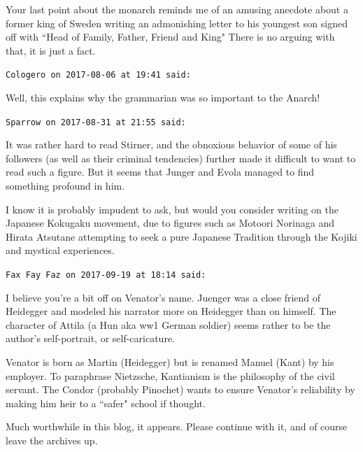 \begin{footnotesize}
\begin{sffamily}
Your last point about the monarch reminds me of an amusing anecdote about a former king of Sweden writing an admonishing letter to his youngest son signed off with ``Head of Family, Father, Friend and King" There is no arguing with that, it is just a fact.


\hfill

\texttt{Cologero on 2017-08-06 at 19:41 said: }

Well, this explains why the grammarian was so important to the Anarch!


\hfill

\texttt{Sparrow on 2017-08-31 at 21:55 said: }

It was rather hard to read Stirner, and the obnoxious behavior of some of his followers (as well as their criminal tendencies) further made it difficult to want to read such a figure. But it seems that Junger and Evola managed to find something profound in him. 

I know it is probably impudent to ask, but would you consider writing on the Japanese Kokugaku movement, due to figures such as Motoori Norinaga and Hirata Atsutane attempting to seek a pure Japanese Tradition through the Kojiki and mystical experiences.


\hfill

\texttt{Fax Fay Faz on 2017-09-19 at 18:14 said: }

I believe you're a bit off on Venator's name. Juenger was a close friend of Heidegger and modeled his narrator more on Heidegger than on himself. The character of Attila (a Hun aka ww1 German soldier) seems rather to be the author's self-portrait, or self-caricature.

Venator is born as Martin (Heidegger) but is renamed Manuel (Kant) by his employer. To paraphrase Nietzsche, Kantianism is the philosophy of the civil servant. The Condor (probably Pinochet) wants to ensure Venator's reliability by making him heir to a ``safer" school if thought.

Much worthwhile in this blog, it appears. Please continue with it, and of course leave the archives up.


\end{sffamily}\end{footnotesize}

